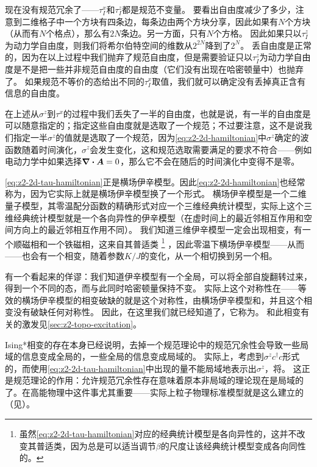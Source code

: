 现在没有规范冗余了——${\tau}^x_{I}$和${\tau}^z_I$都是规范不变量。
要看出自由度减少了多少，注意到二维格子中一个方块有四条边，每条边由两个方块分享，因此如果有$N$个方块（从而有$N$个格点），那么有$2N$条边。另一方面，只有$N$个方格。
因此如果只以${\tau}^z_I$为动力学自由度，则我们将希尔伯特空间的维数从$2^{2N}$降到了$2^N$。
丢自由度是正常的，因为在以上过程中我们抛弃了规范自由度，但是需要验证只以${\tau}^z_I$为动力学自由度是不是把一些并非规范自由度的自由度（它们没有出现在哈密顿量中）也抛弃了。
如果规范不等价的态给出不同的${\tau}^x_I$取值，我们就可以确定没有丢掉真正含有信息的自由度。

在上述从$\sigma^z$到$\tau^x$的过程中我们丢失了一半的自由度，也就是说，有一半的自由度是可以随意指定的；指定这些自由度就是选取了一个规范；不过要注意，这不是说我们指定一半$\sigma^z$的值就是选取了一个规范，因为\eqref{eq:z2-2d-hamiltonian}中$\sigma^z$确定的波函数随着时间演化，$\sigma^z$会发生变化，这和规范选取需要满足的要求不符合——例如电动力学中如果选择$\div{\vb*{A}} = 0$，那么它不会在随后的时间演化中变得不是零。

\eqref{eq:z2-2d-tau-hamiltonian}正是横场伊辛模型。因此\eqref{eq:z2-2d-hamiltonian}也经常称为，因为它实际上就是横场伊辛模型换了一个形式。
横场伊辛模型是一个二维量子模型，其零温配分函数的精确形式对应一个三维经典统计模型，实际上这个三维经典统计模型就是一个各向异性的伊辛模型（在虚时间上的最近邻相互作用和空间方向上的最近邻相互作用不同）。
我们知道三维伊辛模型一定会出现相变，有一个顺磁相和一个铁磁相，这来自其普适类%
\footnote{
    虽然\eqref{eq:z2-2d-tau-hamiltonian}对应的经典统计模型是各向异性的，这并不改变其普适类，因为总是可以适当调节$\beta$的尺度让该经典统计模型变成各向同性的。
}%
，因此零温下横场伊辛模型——从而——也会有一个相变，随着参数$K / J$的变化，从一个相切换到另一个相。

有一个看起来的佯谬：我们知道伊辛模型有一个全局，可以将全部自旋翻转过来，得到一个不同的态，而与此同时哈密顿量保持不变。
实际上这个对称性在——等效的横场伊辛模型的相变破缺的就是这个对称性，由横场伊辛模型和，并且这个相变没有破缺任何对称性。
因此，在这里我们就已经知道了，它称为。
和此相变有关的激发见\autoref{sec:z2-topo-excitation}。

Ising*相变的存在本身已经说明，去掉一个规范理论中的规范冗余性会导致一些局域的信息变成全局的，一些全局的信息变成局域的。
实际上，考虑到$\sigma^z c^\dagger c$形式的，而使用\eqref{eq:z2-2d-tau-hamiltonian}中出现的量不能局域地表示出$\sigma^z$，将。
这正是规范理论的作用：允许规范冗余性存在意味着原本非局域的理论现在是局域的了。在高能物理中这件事尤其重要——实际上粒子物理标准模型就是这么建立的（见\qftdoc）。

